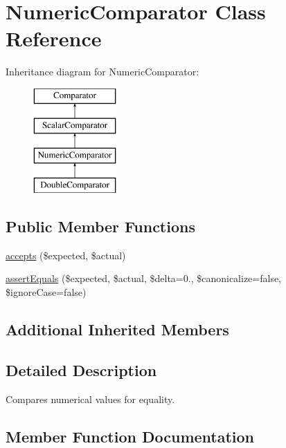 \hypertarget{class_sebastian_bergmann_1_1_comparator_1_1_numeric_comparator}{}\section{Numeric\+Comparator Class Reference}
\label{class_sebastian_bergmann_1_1_comparator_1_1_numeric_comparator}
Inheritance diagram for Numeric\+Comparator\+:\begin{figure}[H]
\begin{center}
\leavevmode
\includegraphics[height=4.000000cm]{class_sebastian_bergmann_1_1_comparator_1_1_numeric_comparator}
\end{center}
\end{figure}
\subsection*{Public Member Functions}
\begin{DoxyCompactItemize}
\item 
\mbox{\hyperlink{class_sebastian_bergmann_1_1_comparator_1_1_numeric_comparator_ae9bdf0cba02ce3470169280656cdeb84}{accepts}} (\$expected, \$actual)
\item 
\mbox{\hyperlink{class_sebastian_bergmann_1_1_comparator_1_1_numeric_comparator_adb3679ea06503114394431cb250ec5a4}{assert\+Equals}} (\$expected, \$actual, \$delta=0., \$canonicalize=false, \$ignore\+Case=false)
\end{DoxyCompactItemize}
\subsection*{Additional Inherited Members}


\subsection{Detailed Description}
Compares numerical values for equality. 

\subsection{Member Function Documentation}
\mbox{\label{class_sebastian_bergmann_1_1_comparator_1_1_numeric_comparator_ae9bdf0cba02ce3470169280656cdeb84}} 
